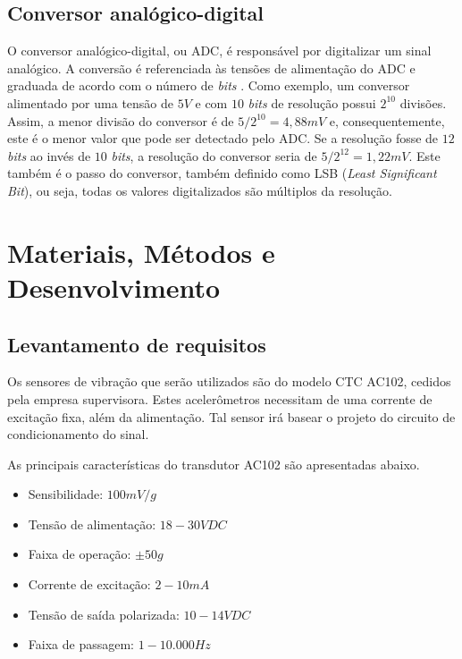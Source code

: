 \documentclass[
	12pt,				%
	openright,			%
	twoside,			%
	a4paper,			%
	english,			%
	french,				%
	spanish,			%
	brazil,				%
	]{abntex2}
\begin{document}
	\section{Conversor analógico-digital}
		O conversor analógico-digital, ou ADC, é responsável por digitalizar
		um sinal analógico. A conversão é referenciada às tensões de alimentação
		do ADC e graduada de acordo com o número de \textit{bits} \cite{artElectronics}. Como exemplo,
		um conversor alimentado por uma tensão de $5V$ e com $10$ \textit{bits} de
		resolução possui $2^{10}$ divisões. Assim, a menor divisão do conversor é
		de $5/2^{10} = 4,88mV$ e, consequentemente, este é o menor valor que pode
		ser detectado pelo ADC. Se a resolução fosse de $12$ \textit{bits} ao invés
		de $10$ \textit{bits}, a resolução do conversor seria de $5/2^{12}=1,22mV$.
		Este também é o passo do conversor, também definido como LSB
		(\textit{Least Significant Bit}), ou seja, todas os valores digitalizados
		são múltiplos da resolução.

\chapter{Materiais, Métodos e Desenvolvimento}
	\section{Levantamento de requisitos}
		Os sensores de vibração que serão utilizados são do modelo CTC AC102, cedidos pela empresa supervisora. Estes acelerômetros necessitam de uma corrente de excitação fixa, além da alimentação. Tal sensor irá basear o projeto do circuito de condicionamento do sinal.
		
		As principais características do transdutor AC102 são apresentadas
		abaixo.\cite{ctc}
		
		\begin{itemize}
			\item Sensibilidade: $100mV/g$
			\item Tensão de alimentação: $18 - 30 VDC$
			\item Faixa de operação: $\pm 50g$
			\item Corrente de excitação: $2 - 10mA$
			\item Tensão de saída polarizada: $10 - 14 VDC$
			\item Faixa de passagem: $1 - 10.000 Hz$
		\end{itemize}
\end{document}
